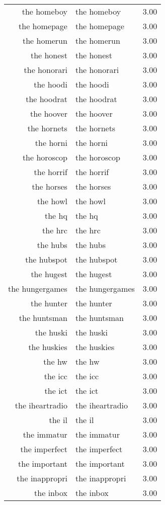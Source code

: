 \begin{table}[ht]
\begin{tabular}{rlr}
  the homeboy & the homeboy & 3.00 \\ 
  the homepage & the homepage & 3.00 \\ 
  the homerun & the homerun & 3.00 \\ 
  the honest & the honest & 3.00 \\ 
  the honorari & the honorari & 3.00 \\ 
  the hoodi & the hoodi & 3.00 \\ 
  the hoodrat & the hoodrat & 3.00 \\ 
  the hoover & the hoover & 3.00 \\ 
  the hornets & the hornets & 3.00 \\ 
  the horni & the horni & 3.00 \\ 
  the horoscop & the horoscop & 3.00 \\ 
  the horrif & the horrif & 3.00 \\ 
  the horses & the horses & 3.00 \\ 
  the howl & the howl & 3.00 \\ 
  the hq & the hq & 3.00 \\ 
  the hrc & the hrc & 3.00 \\ 
  the hubs & the hubs & 3.00 \\ 
  the hubspot & the hubspot & 3.00 \\ 
  the hugest & the hugest & 3.00 \\ 
  the hungergames & the hungergames & 3.00 \\ 
  the hunter & the hunter & 3.00 \\ 
  the huntsman & the huntsman & 3.00 \\ 
  the huski & the huski & 3.00 \\ 
  the huskies & the huskies & 3.00 \\ 
  the hw & the hw & 3.00 \\ 
  the icc & the icc & 3.00 \\ 
  the ict & the ict & 3.00 \\ 
  the iheartradio & the iheartradio & 3.00 \\ 
  the il & the il & 3.00 \\ 
  the immatur & the immatur & 3.00 \\ 
  the imperfect & the imperfect & 3.00 \\ 
  the important & the important & 3.00 \\ 
  the inappropri & the inappropri & 3.00 \\ 
  the inbox & the inbox & 3.00 \\ 

\end{tabular}
\end{table}
